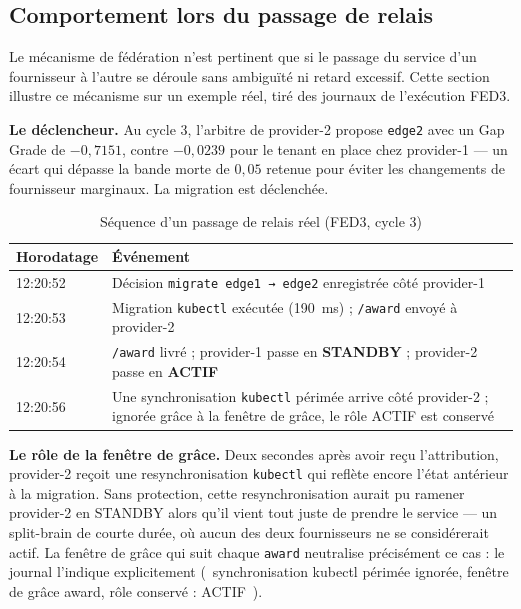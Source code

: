 \subsection{Comportement lors du passage de relais}
\label{sec:passage-relais}

Le mécanisme de fédération n'est pertinent que si le passage du service d'un fournisseur à l'autre se déroule sans ambiguïté ni retard excessif. Cette section illustre ce mécanisme sur un exemple réel, tiré des journaux de l'exécution FED3.

\textbf{Le déclencheur.} Au cycle 3, l'arbitre de provider-2 propose \texttt{edge2} avec un Gap Grade de $-0{,}7151$, contre $-0{,}0239$ pour le tenant en place chez provider-1 — un écart qui dépasse la bande morte de $0{,}05$ retenue pour éviter les changements de fournisseur marginaux. La migration est déclenchée.

\begin{table}[H]
    \centering
    \caption{Séquence d'un passage de relais réel (FED3, cycle 3)}
    \label{tab:passage-relais}
    \begin{tabular}{lp{7.5cm}}
        \toprule
        \textbf{Horodatage} & \textbf{Événement} \\
        \midrule
        12:20:52 & Décision \texttt{migrate edge1 → edge2} enregistrée côté provider-1 \\
        12:20:53 & Migration \texttt{kubectl} exécutée (190~ms) ; \texttt{/award} envoyé à provider-2 \\
        12:20:54 & \texttt{/award} livré ; provider-1 passe en \textbf{STANDBY} ; provider-2 passe en \textbf{ACTIF} \\
        12:20:56 & Une synchronisation \texttt{kubectl} périmée arrive côté provider-2 ; ignorée grâce à la fenêtre de grâce, le rôle ACTIF est conservé \\
        \bottomrule
    \end{tabular}
\end{table}

\textbf{Le rôle de la fenêtre de grâce.} Deux secondes après avoir reçu l'attribution, provider-2 reçoit une resynchronisation \texttt{kubectl} qui reflète encore l'état antérieur à la migration. Sans protection, cette resynchronisation aurait pu ramener provider-2 en STANDBY alors qu'il vient tout juste de prendre le service — un split-brain de courte durée, où aucun des deux fournisseurs ne se considérerait actif. La fenêtre de grâce qui suit chaque \texttt{award} neutralise précisément ce cas : le journal l'indique explicitement (\og~synchronisation kubectl périmée ignorée, fenêtre de grâce award, rôle conservé : ACTIF~\fg{}).

